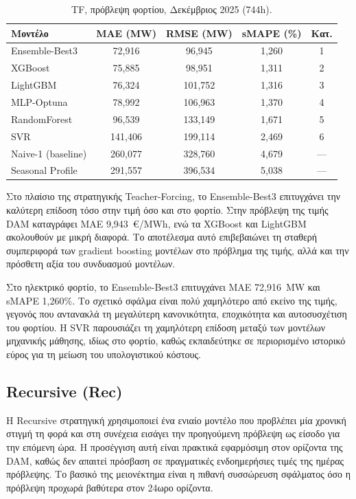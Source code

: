 \begin{table}[H]
  \centering
  \caption{TF, πρόβλεψη φορτίου, Δεκέμβριος 2025 (744h).}
  \label{tab:tf_load_dec}
  \begin{tabular}{lcccc}
    \toprule
    \textbf{Μοντέλο} & \textbf{MAE (MW)} & \textbf{RMSE (MW)} & \textbf{sMAPE (\%)} & \textbf{Κατ.} \\
    \midrule
    Ensemble-Best3        & 72,916  & 96,945  & 1,260 & 1 \\
    XGBoost               & 75,885  & 98,951  & 1,311 & 2 \\
    LightGBM              & 76,324  & 101,752 & 1,316 & 3 \\
    MLP-Optuna            & 78,992  & 106,963 & 1,370 & 4 \\
    RandomForest          & 96,539  & 133,149 & 1,671 & 5 \\
    SVR                   & 141,406 & 199,114 & 2,469 & 6 \\
    \midrule
    Naive-1 (baseline)    & 260,077 & 328,760 & 4,679 & --- \\
    Seasonal Profile      & 291,557 & 396,534 & 5,038 & --- \\
    \bottomrule
  \end{tabular}
\end{table}

Στο πλαίσιο της στρατηγικής Teacher-Forcing, το Ensemble-Best3 επιτυγχάνει την καλύτερη
επίδοση τόσο στην τιμή όσο και στο φορτίο. Στην πρόβλεψη της τιμής DAM καταγράφει
MAE 9,943~€/MWh, ενώ τα XGBoost και LightGBM ακολουθούν με μικρή διαφορά. Το αποτέλεσμα
αυτό επιβεβαιώνει τη σταθερή συμπεριφορά των gradient boosting μοντέλων στο πρόβλημα
της τιμής, αλλά και την πρόσθετη αξία του συνδυασμού μοντέλων.

Στο ηλεκτρικό φορτίο, το Ensemble-Best3 επιτυγχάνει MAE 72,916~MW και sMAPE 1,260\%.
Το σχετικό σφάλμα είναι πολύ χαμηλότερο από εκείνο της τιμής, γεγονός που αντανακλά τη
μεγαλύτερη κανονικότητα, εποχικότητα και αυτοσυσχέτιση του φορτίου. Η SVR παρουσιάζει
τη χαμηλότερη επίδοση μεταξύ των μοντέλων μηχανικής μάθησης, ιδίως στο φορτίο,
καθώς εκπαιδεύτηκε σε περιορισμένο ιστορικό εύρος για τη μείωση του υπολογιστικού
κόστους.

\subsection{Recursive (Rec)}
\label{subsec:rec_static_dec}

Η Recursive στρατηγική χρησιμοποιεί ένα ενιαίο μοντέλο που προβλέπει μία χρονική στιγμή
τη φορά και στη συνέχεια εισάγει την προηγούμενη πρόβλεψη ως είσοδο για την επόμενη
ώρα. Η προσέγγιση αυτή είναι πρακτικά εφαρμόσιμη στον ορίζοντα της DAM, καθώς δεν
απαιτεί πρόσβαση σε πραγματικές ενδοημερήσιες τιμές της ημέρας πρόβλεψης. Το βασικό
της μειονέκτημα είναι η πιθανή συσσώρευση σφάλματος όσο η πρόβλεψη προχωρά βαθύτερα
στον 24ωρο ορίζοντα.

